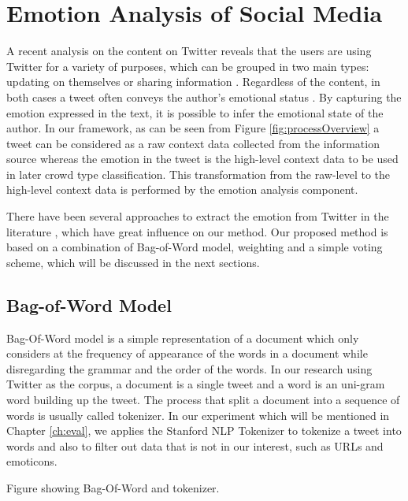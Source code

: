 \section{Emotion Analysis of Social Media}

A recent analysis on the content on Twitter reveals that the users are using Twitter for a variety of purposes, which can be grouped in two main types: updating on themselves or sharing information \citep{java2007we}. Regardless of the content, in both cases a tweet often conveys the author's emotional status \citep{bollen2009modeling}. By capturing the emotion expressed in the text, it is possible to infer the emotional state of the author. In our framework, as can be seen from Figure \ref{fig:processOverview} a tweet can be considered as a raw context data collected from the information source whereas the emotion in the tweet is the high-level context data to be used in later crowd type classification. This transformation from the raw-level to the high-level context data is performed by the emotion analysis component.

There have been several approaches to extract the emotion from Twitter in the literature \citep{roberts2012empatweet, bollen2009modeling, mohammad2012emotional, mohammad2014using}, which have great influence on our method. Our proposed method is based on a combination of Bag-of-Word model, weighting and a simple voting scheme, which will be discussed in the next sections.

\subsection{Bag-of-Word Model}
Bag-Of-Word model is a simple representation of a document which only considers at the frequency of appearance of the words in a document while disregarding the grammar and the order of the words. In our research using Twitter as the corpus, a document is a single tweet and a word is an uni-gram word building up the tweet. The process that split a document into a sequence of words is usually called tokenizer. In our experiment which will be mentioned in Chapter \ref{ch:eval}, we applies the Stanford NLP Tokenizer to tokenize a tweet into words and also to filter out data that is not in our interest, such as URLs and emoticons. 

Figure showing Bag-Of-Word and tokenizer.

